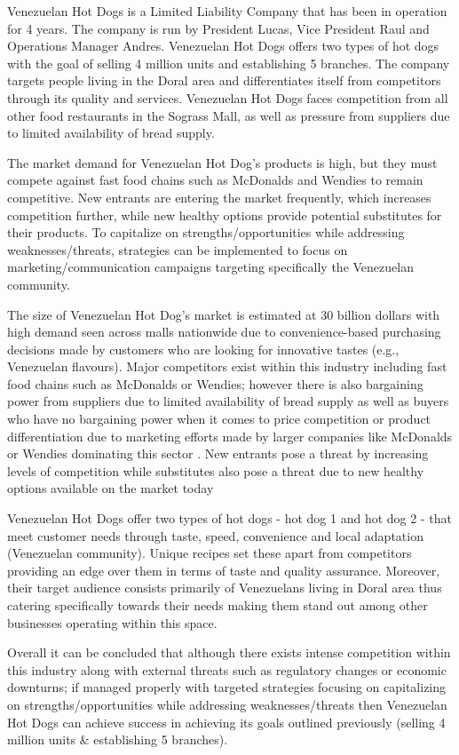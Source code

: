 

Venezuelan Hot Dogs is a Limited Liability Company that has been in operation for 4 years. The company is run by President Lucas, Vice President Raul and Operations Manager Andres. Venezuelan Hot Dogs offers two types of hot dogs with the goal of selling 4 million units and establishing 5 branches. The company targets people living in the Doral area and differentiates itself from competitors through its quality and services. Venezuelan Hot Dogs faces competition from all other food restaurants in the Sograss Mall, as well as pressure from suppliers due to limited availability of bread supply. 

The market demand for Venezuelan Hot Dog's products is high, but they must compete against fast food chains such as McDonalds and Wendies to remain competitive. New entrants are entering the market frequently, which increases competition further, while new healthy options provide potential substitutes for their products. To capitalize on strengths/opportunities while addressing weaknesses/threats, strategies can be implemented to focus on marketing/communication campaigns targeting specifically the Venezuelan community. 

The size of Venezuelan Hot Dog's market is estimated at 30 billion dollars with high demand seen across malls nationwide due to convenience-based purchasing decisions made by customers who are looking for innovative tastes (e.g., Venezuelan flavours). Major competitors exist within this industry including fast food chains such as McDonalds or Wendies; however there is also bargaining power from suppliers due to limited availability of bread supply as well as buyers who have no bargaining power when it comes to price competition or product differentiation due to marketing efforts made by larger companies like McDonalds or Wendies dominating this sector . New entrants pose a threat by increasing levels of competition while substitutes also pose a threat due to new healthy options available on the market today 

Venezuelan Hot Dogs offer two types of hot dogs - hot dog 1 and hot dog 2 - that meet customer needs through taste, speed, convenience and local adaptation (Venezuelan community). Unique recipes set these apart from competitors providing an edge over them in terms of taste and quality assurance. Moreover, their target audience consists primarily of Venezuelans living in Doral area thus catering specifically towards their needs making them stand out among other businesses operating within this space.  

Overall it can be concluded that although there exists intense competition within this industry along with external threats such as regulatory changes or economic downturns; if managed properly with targeted strategies focusing on capitalizing on strengths/opportunities while addressing weaknesses/threats then Venezuelan Hot Dogs can achieve success in achieving its goals outlined previously (selling 4 million units & establishing 5 branches).